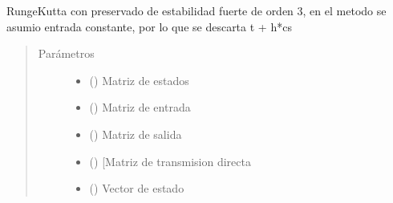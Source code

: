 \documentclass[letterpaper,10pt,spanish]{sphinxmanual}
\begin{document}
\begin{fulllineitems}
\label{\detokenize{codigos/rk_generator:rk_generator.SSPRK3}}
Runge\sphinxhyphen{}Kutta con preservado de estabilidad fuerte de orden 3, en el metodo se asumio entrada constante, por lo que se descarta t + h*cs
\begin{quote}\begin{description}
\item[{Parámetros}] \leavevmode\begin{itemize}
\item {} 
 (\sphinxstyleliteralemphasis{\sphinxupquote{, }}\sphinxstyleliteralemphasis{\sphinxupquote{, }}) \textendash{} Matriz de estados

\item {} 
 (\sphinxstyleliteralemphasis{\sphinxupquote{, }}\sphinxstyleliteralemphasis{\sphinxupquote{, }}) \textendash{} Matriz de entrada

\item {} 
 (\sphinxstyleliteralemphasis{\sphinxupquote{, }}\sphinxstyleliteralemphasis{\sphinxupquote{, }}) \textendash{} Matriz de salida

\item {} 
 (\sphinxstyleliteralemphasis{\sphinxupquote{, }}\sphinxstyleliteralemphasis{\sphinxupquote{, }}) \textendash{} {[}Matriz de transmision directa

\item {} 
 (\sphinxstyleliteralemphasis{\sphinxupquote{, }}\sphinxstyleliteralemphasis{\sphinxupquote{, }}) \textendash{} Vector de estado


\end{itemize}
\end{description}
\end{quote}
\end{fulllineitems}
\end{document}
